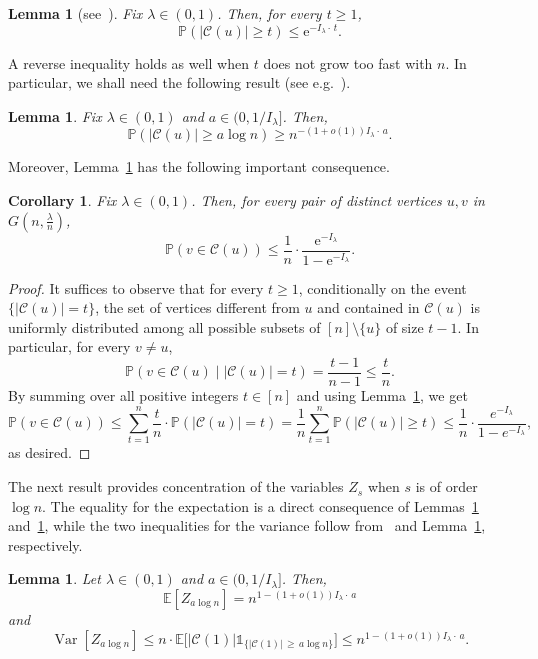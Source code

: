 \documentclass[10pt]{amsart}
\newtheorem{lemm}[theo]{Lemma}\newtheorem{prop}[theo]{Proposition}\newtheorem{coro}[theo]{Corollary}\newtheorem{conj}[theo]{Conjecture}
\theoremstyle{definition}\newtheorem{defi}[theo]{Definition}\newtheorem{rema}[theo]{Remark}\newtheorem{exam}[theo]{Example}\newtheorem{exem}[theo]{Example}\newtheorem{nota}[theo]{Notation}
\newcommand{\e}{\mathrm{e}}
\renewcommand{\Pr}{\mathbb{P}}
\newcommand{\bbE}{\mathbb{E}}
\newcommand{\cC}{\mathcal{C}}
\DeclareMathOperator{\rVar}{Var}
\begin{document}
\begin{lemm}[{see~\cite[(4.3.11)]{Hof16}}]\label{lem:sizeERC}
Fix $\lambda\in (0,1)$. Then, for every $t\ge 1$,
\[
\Pr(|\cC(u)|\ge t) \le \e^{- I_\lambda\cdot\, t}.
\]
\end{lemm}

A reverse inequality holds as well when $t$ does not grow too fast with $n$. In particular, we shall need the following result (see e.g.~\cite[(4.3.34) and (4.3.37)]{Hof16}).

\begin{lemm}\label{lem:reverse.ERC}
Fix $\lambda\in(0,1)$ and $a\in (0,1/I_\lambda]$. Then,
\[
\Pr(|\cC(u)|\ge a\log n) \ge n^{-(1+o(1))I_\lambda\cdot\, a}.
\]
\end{lemm}

Moreover, Lemma~\ref{lem:sizeERC} has the following important consequence.

\begin{coro}\label{cor:connectionER}
Fix $\lambda\in (0,1)$. Then, for every pair of distinct vertices $u,v$ in $G(n,\frac \lambda n)$,
\[
\Pr(v\in \cC(u)) \le \frac 1n \cdot \frac {\e^{-I_\lambda}}{1-\e^{-I_\lambda}}.
\]
\end{coro}
\begin{proof}
It suffices to observe that for every $t\ge 1$, conditionally on the event $\{|\cC(u)|=t\}$, the set of vertices different from $u$ and contained in $\cC(u)$ is uniformly distributed among all possible subsets of $[n]\setminus \{u\}$ of size $t-1$. In particular, for every $v\neq u$,
\begin{equation}\label{prob.cond.connect}
\Pr(v\in \cC(u) \mid |\cC(u)|= t) = \frac{t-1}{n-1}\le \frac{t}{n}.
\end{equation}
By summing over all positive integers $t\in [n]$ and using Lemma~\ref{lem:sizeERC}, we get
\[
\Pr(v\in \cC(u)) \le \sum_{t = 1}^n \frac{t}{n}\cdot \Pr(|\cC(u)|= t) = \frac 1n \sum_{t = 1}^n\Pr(|\cC(u)|\ge t) \le \frac 1n \cdot \frac {e^{-I_\lambda}}{1-e^{-I_\lambda}},
\]
as desired.
\end{proof}

The next result provides concentration of the variables $Z_s$ when $s$ is of order $\log n$. The equality for the expectation is a direct consequence of Lemmas~\ref{lem:sizeERC} and~\ref{lem:reverse.ERC}, while the two inequalities for the variance follow from~\cite[Proposition~4.7]{Hof16} and Lemma~\ref{lem:sizeERC}, respectively.

\begin{lemm}\label{lem:clustersize}
Let $\lambda\in (0,1)$ and $a\in (0,1/I_\lambda]$. Then,
\[
\bbE\left[Z_{a\log n}\right] = n^{1-(1+o(1)) I_\lambda\cdot\, a}
\]
and
\[
\rVar[Z_{a\log n}] \le n\cdot \bbE\big[|\cC(1)|\mathds{1}_{\{|\cC(1)|\,\ge\, a\log n\}}\big]\le n^{1-(1+o(1)) I_\lambda\cdot\, a}.
\]
\end{lemm}
\end{document}
